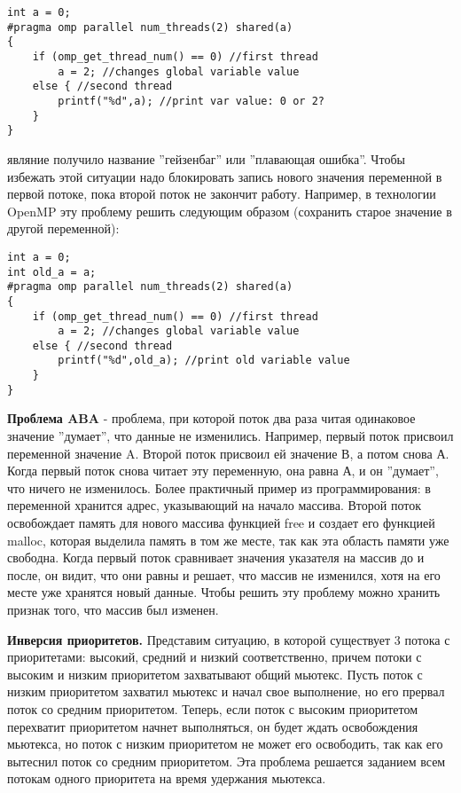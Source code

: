 {		\begin{verbatim}int a = 0;
#pragma omp parallel num_threads(2) shared(a)
{
    if (omp_get_thread_num() == 0) //first thread 
        a = 2; //changes global variable value
    else { //second thread 
        printf("%d",a); //print var value: 0 or 2?
    }
}\end{verbatim}
	 являние получило название ''гейзенбаг'' или ''плавающая ошибка''. Чтобы избежать этой ситуации надо блокировать запись нового значения переменной в первой потоке, пока второй поток не закончит работу. Например, в технологии OpenMP эту проблему решить следующим образом (сохранить старое значение в другой переменной):
		\begin{verbatim}int a = 0;
int old_a = a;
#pragma omp parallel num_threads(2) shared(a)
{
    if (omp_get_thread_num() == 0) //first thread 
        a = 2; //changes global variable value
    else { //second thread 
        printf("%d",old_a); //print old variable value
    }
}\end{verbatim}
	\par\textbf{Проблема ABA} - проблема, при которой поток два раза читая одинаковое значение ''думает'', что данные не изменились. Например, первый поток присвоил переменной значение A. Второй поток присвоил ей значение В, а потом снова А. Когда первый поток снова читает эту переменную, она равна А, и он ''думает'', что ничего не изменилось. Более практичный пример из программирования: в переменной хранится адрес, указывающий на начало массива. Второй поток освобождает память для нового массива функцией free и создает его функцией malloc, которая выделила память в том же месте, так как эта область памяти уже свободна. Когда первый поток сравнивает значения указателя на массив до и после, он видит, что они равны и решает, что массив не изменился, хотя на его месте уже хранятся новый данные. Чтобы решить эту проблему можно хранить признак того, что массив был изменен.
	\par\textbf{Инверсия приоритетов.} Представим ситуацию, в которой существует 3 потока с приоритетами: высокий, средний и низкий соответственно, причем потоки с высоким и низким приоритетом захватывают общий мьютекс. Пусть поток с низким приоритетом захватил мьютекс и начал свое выполнение, но его прервал поток со средним приоритетом. Теперь, если поток с высоким приоритетом перехватит приоритетом начнет выполняться, он будет ждать освобождения мьютекса, но поток с низким приоритетом не может его освободить, так как его вытеснил поток со средним приоритетом. Эта проблема решается заданием всем потокам одного приоритета на время удержания мьютекса.
}
